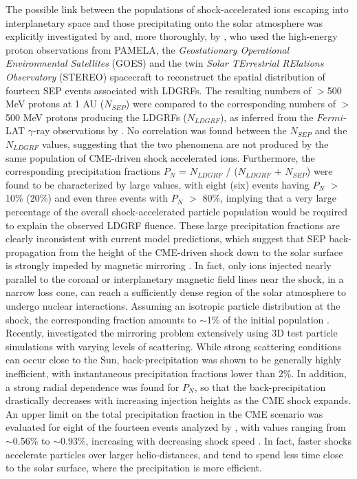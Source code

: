 \documentclass{aastex61}
\begin{document}
The possible link between the populations of shock-accelerated ions escaping into  interplanetary space and those precipitating onto the solar atmosphere was explicitly investigated by \citet{ref:SHARE2018} and, more thoroughly, by \citet{ref:DENOLFO2019}, who used the high-energy proton observations from PAMELA, the \textit{Geostationary Operational Environmental Satellites} (GOES) and the twin \textit{Solar TErrestrial RElations Observatory} (STEREO) spacecraft to reconstruct the spatial distribution of fourteen SEP events associated with LDGRFs. The resulting numbers of $>$500 MeV protons at 1 AU ($N_{SEP}$) were compared to the corresponding numbers of $>$500 MeV protons producing the LDGRFs ($N_{LDGRF}$), as inferred from the $Fermi$-LAT $\gamma$-ray observations by \citet{ref:SHARE2018}. No correlation was found between the $N_{SEP}$ and the $N_{LDGRF}$ values, suggesting that the two phenomena are not produced by the same population of CME-driven shock accelerated ions. 
Furthermore, the corresponding precipitation fractions $P_{N}$ = $N_{LDGRF}$ / ($N_{LDGRF}$ + $N_{SEP}$) were found to be characterized by large values, with eight (six) events having $P_{N}$ $>$ 10\% (20\%) and even three events with $P_{N}$ $>$ 80\%, implying that a very large percentage of the overall shock-accelerated particle population would be required to explain the observed LDGRF fluence.
These large precipitation fractions are clearly inconsistent with current model predictions, which suggest that SEP back-propagation from 
the height of the CME-driven shock down
to the solar surface is strongly impeded by magnetic mirroring \citep{ref:HUDSON2018,ref:KLEIN2018}. In fact, only ions injected nearly parallel to the coronal or interplanetary magnetic field lines 
near the shock, in a narrow loss cone, can reach a sufficiently dense region of the solar atmosphere to undergo nuclear interactions. Assuming an isotropic particle distribution at the shock, the corresponding fraction amounts to $\sim$1\% of the initial population \citep{ref:KLEIN2018}.
Recently, \citet{ref:HUTCHINSON2022} investigated the mirroring problem extensively using 3D test particle simulations with varying levels of scattering. While strong scattering conditions can occur close to the Sun, back-precipitation
was shown to be generally highly inefficient, with instantaneous precipitation fractions lower than 2\%. In addition, a strong radial dependence was found for $P_{N}$, so that the back-precipitation drastically decreases with increasing injection heights as the CME shock expands.
An upper limit on the total precipitation fraction in the CME scenario was evaluated for eight of the fourteen events analyzed by \citet{ref:DENOLFO2019}, with values ranging from $\sim$0.56\% to $\sim$0.93\%, increasing with decreasing shock speed \citep{ref:HUTCHINSON2022}. In fact, faster shocks accelerate particles over larger helio-distances, and tend to spend less time close to the solar surface, where the precipitation is more efficient. 
\end{document}
